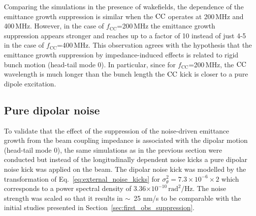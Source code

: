  Comparing the simulations in the presence of wakefields, the dependence of the emittance growth suppression is similar when the ${\mathrm{CC}}$ operates at 200\,MHz and 400\,MHz. However, in the case of $f_\mathrm{CC}$=200\,MHz the emittance growth suppression appears stronger and reaches up to a factor of 10 instead of just 4-5 in the case of $f_\mathrm{CC}$=400\,MHz. This observation agrees with the hypothesis that the emittance growth suppression by impedance-induced effects is related to rigid bunch motion (head-tail mode 0). In particular, since for $f_\mathrm{CC}$=200\,MHz, the ${\mathrm{CC}}$ wavelength is much longer than the bunch length the ${\mathrm{CC}}$ kick is closer to a pure dipole excitation. 
 
 
 
 




\subsection{Pure dipolar noise}\label{subsec:dipole_noise}
To validate that the effect of the suppression of the noise-driven emittance growth from the beam coupling impedance is associated with the dipolar motion (head-tail mode 0), the same simulations as in the previous section were conducted but instead of the longitudinally dependent noise kicks a pure dipolar noise kick was applied on the beam. The dipolar noise kick was modelled by the transformation of Eq.~\eqref{eq:external_noise_kicks} for $\sigma_\theta^2=7.3\times 10^{-6} \times 2$ which corresponds to a power spectral density of 3.36$\times 10^{-10}$\,$\mathrm{rad^2/Hz}$. The noise strength was scaled so that it results in $\sim$~25 nm/s to be comparable with the initial studies presented in Section~\ref{sec:first_obs_suppression}.

